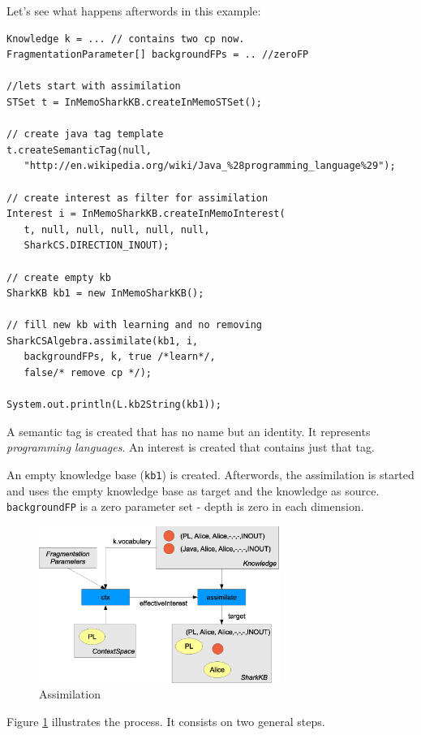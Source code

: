 Let's see what happens afterwords in this example:

\begin{verbatim}
Knowledge k = ... // contains two cp now.
FragmentationParameter[] backgroundFPs = .. //zeroFP

//lets start with assimilation
STSet t = InMemoSharkKB.createInMemoSTSet();

// create java tag template
t.createSemanticTag(null, 
   "http://en.wikipedia.org/wiki/Java_%28programming_language%29");

// create interest as filter for assimilation
Interest i = InMemoSharkKB.createInMemoInterest(
   t, null, null, null, null, null, 
   SharkCS.DIRECTION_INOUT);

// create empty kb
SharkKB kb1 = new InMemoSharkKB();

// fill new kb with learning and no removing
SharkCSAlgebra.assimilate(kb1, i, 
   backgroundFPs, k, true /*learn*/, 
   false/* remove cp */);

System.out.println(L.kb2String(kb1));

\end{verbatim}

A semantic tag is created that has no name but an identity. It represents {\it programming languages}. An interest is created that contains just that tag.

An empty knowledge base ({\tt kb1}) is created. Afterwords, the assimilation is started and uses the empty knowledge base as target and the knowledge as source. 
{\tt backgroundFP} is a zero parameter set - depth is zero in each dimension.

\begin{figure}[t]
\centering
\includegraphics[width=0.70\textwidth]{assimilation.eps}
\caption{Assimilation}
\label{fig:assimilation}
\end{figure}

Figure \ref{fig:assimilation} illustrates the process. It consists on two general steps.

